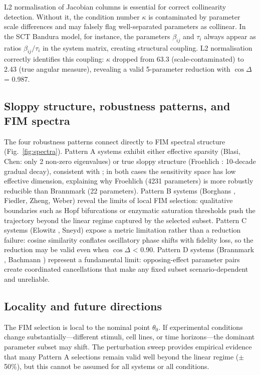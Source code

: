 \documentclass[pdflatex,sn-nature]{sn-jnl}
\begin{document}
L2 normalisation of Jacobian columns is essential for correct collinearity detection. Without it, the condition number $\kappa$ is contaminated by parameter scale differences and may falsely flag well-separated parameters as collinear. In the SCT Bandura model, for instance, the parameters $\beta_{ij}$ and $\tau_i$ always appear as ratios $\beta_{ij}/\tau_i$ in the system matrix, creating structural coupling. L2 normalisation correctly identifies this coupling: $\kappa$ dropped from 63.3 (scale-contaminated) to 2.43 (true angular measure), revealing a valid 5-parameter reduction with $\cos\Delta$ = 0.987.


\subsection{Sloppy structure, robustness patterns, and FIM spectra}\label{sec:sloppy}


The four robustness patterns connect directly to FIM spectral structure (Fig.~\ref{fig:spectra}). Pattern A systems exhibit either effective sparsity (Blasi, Chen: only 2 non-zero eigenvalues) or true sloppy structure (Froehlich \cite{bib12}: 10-decade gradual decay), consistent with \cite{bib15}; in both cases the sensitivity space has low effective dimension, explaining why Froehlich (4231 parameters) is more robustly reducible than Brannmark (22 parameters). Pattern B systems (Borghans \cite{bib7}, Fiedler, Zheng, Weber) reveal the limits of local FIM selection: qualitative boundaries such as Hopf bifurcations or enzymatic saturation thresholds push the trajectory beyond the linear regime captured by the selected subset. Pattern C systems (Elowitz \cite{bib11}, Sneyd) expose a metric limitation rather than a reduction failure: cosine similarity conflates oscillatory phase shifts with fidelity loss, so the reduction may be valid even when $\cos\Delta$ < 0.90. Pattern D systems (Brannmark \cite{bib8}, Bachmann \cite{bib2}) represent a fundamental limit: opposing-effect parameter pairs create coordinated cancellations that make any fixed subset scenario-dependent and unreliable.


\subsection{Locality and future directions}\label{sec:future}


The FIM selection is local to the nominal point $\theta_0$. If experimental conditions change substantially---different stimuli, cell lines, or time horizons---the dominant parameter subset may shift. The perturbation sweep provides empirical evidence that many Pattern A selections remain valid well beyond the linear regime ($\pm$50\%), but this cannot be assumed for all systems or all conditions.
\end{document}
